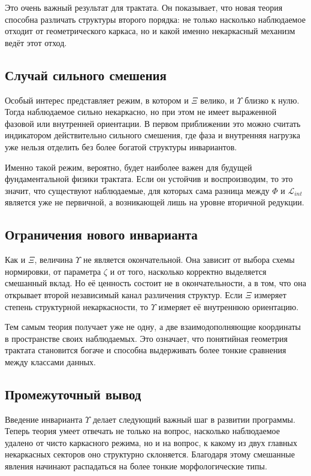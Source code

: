 \documentclass[12pt,a4paper]{article}
\begin{document}
Это очень важный результат для трактата. Он показывает, что новая теория способна различать структуры второго порядка: не только насколько наблюдаемое отходит от геометрического каркаса, но и какой именно некаркасный механизм ведёт этот отход.

\subsection{Случай сильного смешения}

Особый интерес представляет режим, в котором и \(\Xi\) велико, и \(\Upsilon\) близко к нулю. Тогда наблюдаемое сильно некаркасно, но при этом не имеет выраженной фазовой или внутренней ориентации. В первом приближении это можно считать индикатором действительно сильного смешения, где фаза и внутренняя нагрузка уже нельзя отделить без более богатой структуры инвариантов.

Именно такой режим, вероятно, будет наиболее важен для будущей фундаментальной физики трактата. Если он устойчив и воспроизводим, то это значит, что существуют наблюдаемые, для которых сама разница между \(\Phi\) и \(\mathcal{L}_{int}\) является уже не первичной, а возникающей лишь на уровне вторичной редукции.

\subsection{Ограничения нового инварианта}

Как и \(\Xi\), величина \(\Upsilon\) не является окончательной. Она зависит от выбора схемы нормировки, от параметра \(\zeta\) и от того, насколько корректно выделяется смешанный вклад. Но её ценность состоит не в окончательности, а в том, что она открывает второй независимый канал различения структур. Если \(\Xi\) измеряет степень структурной некаркасности, то \(\Upsilon\) измеряет её внутреннюю ориентацию.

Тем самым теория получает уже не одну, а две взаимодополняющие координаты в пространстве своих наблюдаемых. Это означает, что понятийная геометрия трактата становится богаче и способна выдерживать более тонкие сравнения между классами данных.

\subsection{Промежуточный вывод}

Введение инварианта \(\Upsilon\) делает следующий важный шаг в развитии программы. Теперь теория умеет отвечать не только на вопрос, насколько наблюдаемое удалено от чисто каркасного режима, но и на вопрос, к какому из двух главных некаркасных секторов оно структурно склоняется. Благодаря этому смешанные явления начинают распадаться на более тонкие морфологические типы.
\end{document}

